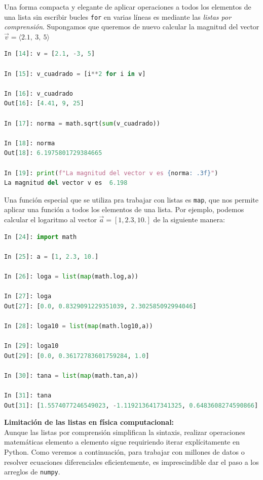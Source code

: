 \documentclass[12pt]{article}
\begin{document}
\begin{description}
Una forma compacta y elegante de aplicar operaciones a todos los elementos de una lista sin escribir 
bucles \lstinline|for| en varias líneas es mediante las \textit{listas por comprensión}.
Supongamos que queremos de nuevo calcular la magnitud del vector $\vec v = \langle 2.1, ~3, ~5\rangle$

\begin{lstlisting}[language=Python]
In [14]: v = [2.1, -3, 5]

In [15]: v_cuadrado = [i**2 for i in v]

In [16]: v_cuadrado
Out[16]: [4.41, 9, 25]

In [17]: norma = math.sqrt(sum(v_cuadrado))

In [18]: norma
Out[18]: 6.1975801729384665

In [19]: print(f"La magnitud del vector v es {norma: .3f}")
La magnitud del vector v es  6.198
\end{lstlisting}
%

\item[\textbf{\textcolor{blue}{\textit{4. Función map:}}}] 
Una función especial que se utiliza pra trabajar con listas es \lstinline|map|, que nos permite aplicar 
una función a todos los elementos de una lista. Por ejemplo, podemos calcular el logaritmo al vector 
$\vec a  = [ 1, 2.3, 10.]$ 
de la siguiente manera:
\begin{lstlisting}[language=Python]
In [24]: import math

In [25]: a = [1, 2.3, 10.]

In [26]: loga = list(map(math.log,a))

In [27]: loga
Out[27]: [0.0, 0.8329091229351039, 2.302585092994046]

In [28]: loga10 = list(map(math.log10,a))

In [29]: loga10
Out[29]: [0.0, 0.36172783601759284, 1.0]

In [30]: tana = list(map(math.tan,a))

In [31]: tana
Out[31]: [1.5574077246549023, -1.1192136417341325, 0.6483608274590866]
\end{lstlisting}

\end{description}

\noindent
\textbf{Limitación de las listas en física computacional:}\\
Aunque las listas por comprensión simplifican la sintaxis, realizar operaciones matemáticas elemento a elemento 
sigue requiriendo iterar explícitamente en Python. Como veremos a continuación, para trabajar con millones de datos o 
resolver ecuaciones diferenciales eficientemente, es imprescindible dar el paso a los arreglos de \texttt{numpy}.
\end{document}
